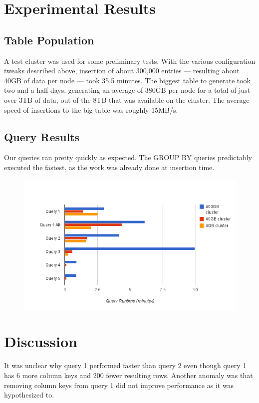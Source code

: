 \documentclass[letterpaper]{article}
\begin{document}
\section{Experimental Results}

\subsection{Table Population}

A test cluster was used for some preliminary tests. With the
various configuration tweaks described above, insertion of about 300,000
entries --- resulting about 40GB of data per node --- took 35.5 minutes.
The biggest table to generate took two and a half days, generating an average
of 380GB per node for a total of just over 3TB of data, out of the 8TB that was
available on the cluster. The average speed of insertions to the big table was
roughly 15MB/s. 

\subsection{Query Results}

Our queries ran pretty quickly as expected. The GROUP BY queries predictably executed the
fastest, as the work was already done at insertion time.
\begin{figure}[h]
	\centering
	\includegraphics[width=\textwidth]{chart}
	\label{fig:Query Execution Times}
\end{figure}

\section{Discussion}

It was unclear why query 1 performed faster than query 2 even though query 1
has 6 more column keys and 200 fewer resulting rows. Another anomaly was that
removing column keys from query 1 did not improve performance as it was
hypothesized to.
\end{document}
